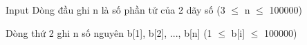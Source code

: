 Input
Dòng đầu ghi n là số phần tử của 2 dãy số (3  $\le$  n  $\le$  100000)  

   Dòng thứ 2 ghi n số nguyên b[1], b[2], ..., b[n] (1  $\le$  b[i]  $\le$  100000)